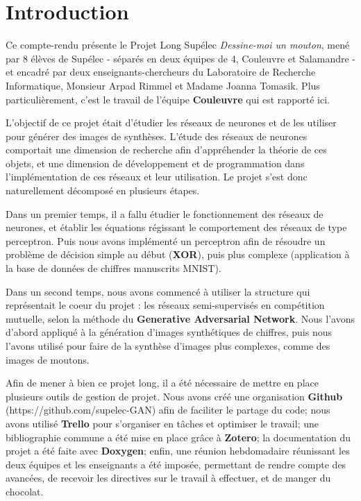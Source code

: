 \chapter*{Introduction}

Ce compte-rendu présente le Projet Long Supélec \textit{Dessine-moi un mouton}, mené par 8 élèves de Supélec - séparés en deux équipes de 4, Couleuvre et Salamandre - et encadré par deux enseignants-chercheurs du Laboratoire de Recherche Informatique, Monsieur Arpad Rimmel et Madame Joanna Tomasik. Plus particulièrement, c'est le travail de l'équipe \textbf{Couleuvre} qui est rapporté ici. 

L'objectif de ce projet était d'étudier les réseaux de neurones et de les utiliser pour générer des images de synthèses. L'étude des réseaux de neurones comportait une dimension de recherche afin d'appréhender la théorie de ces objets, et une dimension de développement et de programmation dans l'implémentation de ces réseaux et leur utilisation. Le projet s'est donc naturellement décomposé en plusieurs étapes.

Dans un premier temps, il a fallu étudier le fonctionnement des réseaux de neurones, et établir les équations régissant le comportement des réseaux de type perceptron. Puis nous avons implémenté un perceptron afin de résoudre un problème de décision simple au début (\textbf{XOR}), puis plus complexe (application à la base de données de chiffres manuscrits MNIST).

Dans un second temps, nous avons commencé à utiliser la structure qui représentait le coeur du projet : les réseaux semi-supervisés en compétition mutuelle, selon la méthode du \textbf{Generative Adversarial Network}. Nous l'avons d'abord appliqué à la génération d'images synthétiques de chiffres, puis nous l'avons utilisé pour faire de la synthèse d'images plus complexes, comme des images de moutons.

Afin de mener à bien ce projet long, il a été nécessaire de mettre en place plusieurs outils de gestion de projet. Nous avons créé une organisation \textbf{Github} (https://github.com/supelec-GAN) afin de faciliter le partage du code; nous avons utilisé \textbf{Trello} pour s'organiser en tâches et optimiser le travail; une bibliographie commune a été mise en place grâce à \textbf{Zotero}; la documentation du projet a été faite avec \textbf{Doxygen}; enfin, une réunion hebdomadaire réunissant les deux équipes et les enseignants a été imposée, permettant de rendre compte des avancées, de recevoir les directives sur le travail à effectuer, et de manger du chocolat. 

